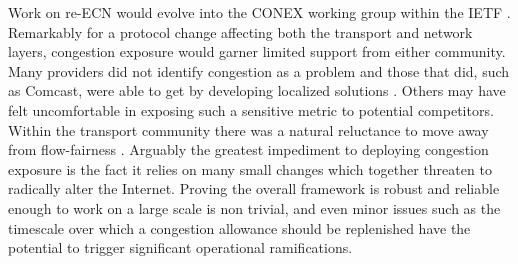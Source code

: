 Work on re-\ac{ECN} would evolve into the \ac{CONEX} working group within the \ac{IETF} \cite{Moncaster:2009p163}.
Remarkably for a protocol change affecting both the transport and network layers, congestion exposure would garner limited support from either community.
Many providers did not identify congestion as a problem and those that did, such as Comcast, were able to get by developing localized solutions \cite{Bastian:2009p495}.
Others may have felt uncomfortable in exposing such a sensitive metric to potential competitors.
Within the transport community there was a natural reluctance to move away from flow-fairness \cite{Floyd:2008p496}.
Arguably the greatest impediment to deploying congestion exposure is the fact it relies on many small changes which together threaten to radically alter the Internet.
Proving the overall framework is robust and reliable enough to work on a large scale is non trivial, and even minor issues such as the timescale over which a congestion allowance should be replenished have the potential to trigger significant operational ramifications.

